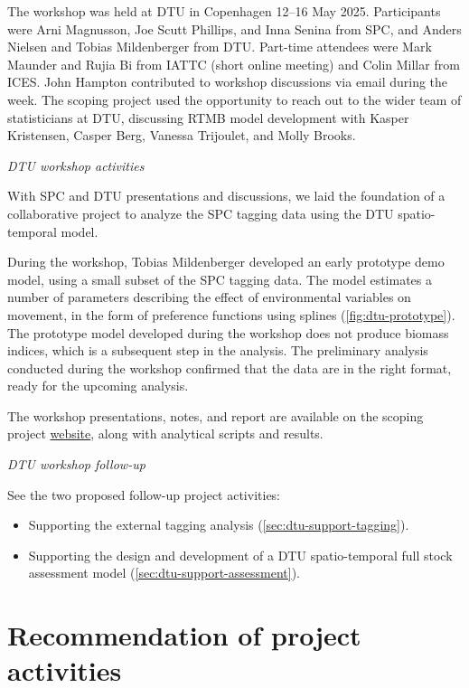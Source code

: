 \documentclass{SCreport}
\newcommand\tree
{https://github.com/PacificCommunity/ofp-sam-transition-plan/tree/main}
\begin{document}
The workshop was held at DTU in Copenhagen 12--16 May 2025. Participants were
Arni Magnusson, Joe Scutt Phillips, and Inna Senina from SPC, and Anders Nielsen
and Tobias Mildenberger from DTU. Part-time attendees were Mark Maunder and
Rujia Bi from IATTC (short online meeting) and Colin Millar from ICES. John
Hampton contributed to workshop discussions via email during the week. The
scoping project used the opportunity to reach out to the wider team of
statisticians at DTU, discussing RTMB model development with Kasper Kristensen,
Casper Berg, Vanessa Trijoulet, and Molly Brooks.

\vspace{2ex}

\textit{DTU workshop activities}

With SPC and DTU presentations and discussions, we laid the foundation of a
collaborative project to analyze the SPC tagging data using the DTU
spatio-temporal model.

During the workshop, Tobias Mildenberger developed an early prototype demo
model, using a small subset of the SPC tagging data. The model estimates a
number of parameters describing the effect of environmental variables on
movement, in the form of preference functions using splines
(\autoref{fig:dtu-prototype}). The prototype model developed during the workshop
does not produce biomass indices, which is a subsequent step in the analysis.
The preliminary analysis conducted during the workshop confirmed that the data
are in the right format, ready for the upcoming analysis.

The workshop presentations, notes, and report are available on the scoping
project \href{\tree/workshops/2025-05-copenhagen}{website}, along with
analytical scripts and results.

\vspace{2ex}

\textit{DTU workshop follow-up}

See the two proposed follow-up project activities:

\begin{itemize}
  \item Supporting the external tagging analysis
  (\autoref{sec:dtu-support-tagging}).
  \item Supporting the design and development of a DTU spatio-temporal full
  stock assessment model (\autoref{sec:dtu-support-assessment}).
\end{itemize}

\section{Recommendation of project activities}
\end{document}
